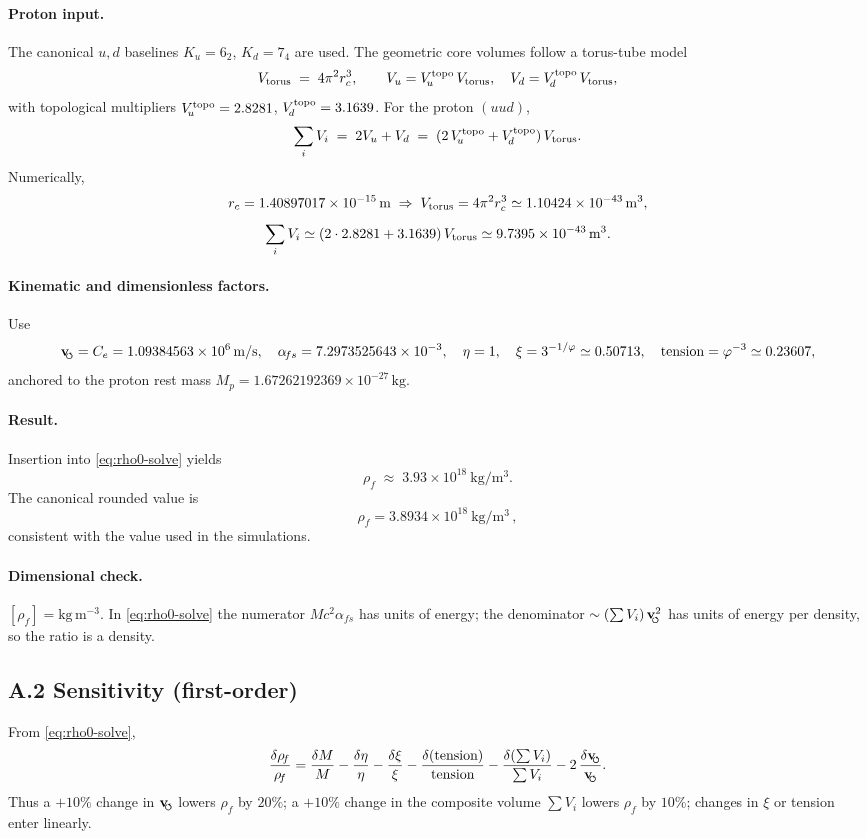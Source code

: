 \documentclass[11pt, preprint,titlepage]{revtex4-2}
\newcommand{\rhoF}{\rho_{\!f}}      %
\newcommand{\swirlarrow}{\!\!\scriptsize\boldsymbol{\circlearrowleft}}
\newcommand{\vswirl}{\mathbf{v}_{\swirlarrow}}
\begin{document}
	\paragraph{Proton input.}
	The canonical \(u,d\) baselines \(K_u=6_2\), \(K_d=7_4\) are used.
	The geometric core volumes follow a torus-tube model
	\[
		V_{\rm torus} \;=\; 4\pi^2 r_c^3,\qquad
		V_u = V_{\!u}^{\rm topo}\,V_{\rm torus},\quad V_d = V_{\!d}^{\rm topo}\,V_{\rm torus},
	\]
	with topological multipliers
	\(V_{\!u}^{\rm topo}=2.8281\), \(V_{\!d}^{\rm topo}=3.1639\).
	For the proton \((uud)\),
	\[
		\sum_i V_i \;=\; 2V_u + V_d \;=\; (2\,V_{\!u}^{\rm topo}+V_{\!d}^{\rm topo})\,V_{\rm torus}.
	\]
	Numerically,
	\[
		r_c = 1.40897017\times 10^{-15}\,\mathrm{m}
		\;\Rightarrow\;
		V_{\rm torus} = 4\pi^2 r_c^3 \simeq 1.10424\times10^{-43}\,\mathrm{m^3},
	\]
	\[
		\sum_i V_i \simeq (2\cdot 2.8281 + 3.1639)\,V_{\rm torus}
		\simeq 9.7395\times 10^{-43}\,\mathrm{m^3}.
	\]

	\paragraph{Kinematic and dimensionless factors.}
	Use
	\[
		\vswirl = C_e = 1.09384563\times10^6\,\mathrm{m/s},\quad
		\alpha_{\!fs}=7.2973525643\times10^{-3},\quad
		\eta=1,\quad \xi = 3^{-1/\varphi}\simeq 0.50713,\quad
		\text{tension} = \varphi^{-3} \simeq 0.23607,
	\]
	anchored to the proton rest mass \(M_p=1.67262192369\times10^{-27}\,\mathrm{kg}\).

	\paragraph{Result.}
	Insertion into \eqref{eq:rho0-solve} yields
	\[
		\rhoF \;\approx\; 3.93\times 10^{18}\ \mathrm{kg/m^3}.
	\]
	The canonical rounded value is
	\[
		\boxed{ \rhoF = 3.8934\times 10^{18}\ \mathrm{kg/m^3} }\,,
	\]
	consistent with the value used in the simulations.

	\paragraph{Dimensional check.}
	\([\rhoF]=\mathrm{kg\,m^{-3}}\).
	In \eqref{eq:rho0-solve} the numerator \(M c^2\alpha_{\!fs}\) has units of energy; the denominator
	\(\sim (\sum V_i)\,\vswirl^{2}\) has units of energy per density, so the ratio is a density.

	\subsection*{A.2 Sensitivity (first-order)}
	From \eqref{eq:rho0-solve},
	\[
		\frac{\delta\rhoF}{\rhoF}
		= \frac{\delta M}{M}
		- \frac{\delta\eta}{\eta}
		- \frac{\delta\xi}{\xi}
		- \frac{\delta(\text{tension})}{\text{tension}}
		- \frac{\delta(\sum V_i)}{\sum V_i}
		- 2\,\frac{\delta \vswirl}{\vswirl}.
	\]
	Thus a \(+10\%\) change in \(\vswirl\) lowers \(\rhoF\) by \(20\%\); a \(+10\%\) change in the composite volume \(\sum V_i\) lowers \(\rhoF\) by \(10\%\); changes in \(\xi\) or tension enter linearly.
\end{document}
